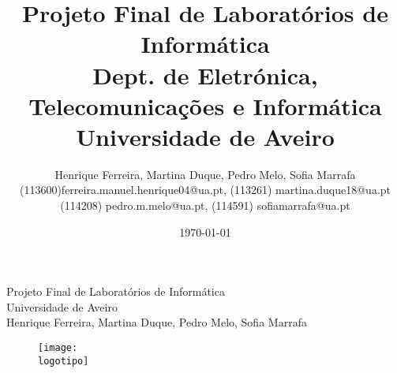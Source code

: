 \documentclass{report}
\begin{document}
%
\def\titulo{Projeto Final de Laboratórios de Informática}
\def\data{DATA}
\def\autores{Henrique Ferreira, Martina Duque, Pedro Melo, Sofia Marrafa}
\def\autorescontactos{(113600)ferreira.manuel.henrique04@ua.pt, (113261) martina.duque18@ua.pt\\(114208) pedro.m.melo@ua.pt, (114591) sofiamarrafa@ua.pt}
\def\versao{VERSAO}
\def\departamento{Dept. de Eletrónica, Telecomunicações e Informática}
\def\empresa{Universidade de Aveiro}
\def\logotipo{ua.pdf}
%
%
\begin{titlepage}

\begin{center}
%
\vspace*{50mm}
%
{\Huge \titulo}\\ 
%
\vspace{10mm}
%
{\Large \empresa}\\
%
\vspace{10mm}
%
{\LARGE \autores}\\ 
%
\vspace{30mm}
%
\begin{figure}[h]
\center
\texttt{[image: \\logotipo]}
\end{figure}
%
\vspace{30mm}
\end{center}
%


\end{titlepage}

\title{%
{\Huge\textbf{\titulo}}\\
{\Large \departamento\\ \empresa}
}
%
\author{%
    \autores \\
    \autorescontactos
}
%
\date{\today}
%
\maketitle

\end{document}
